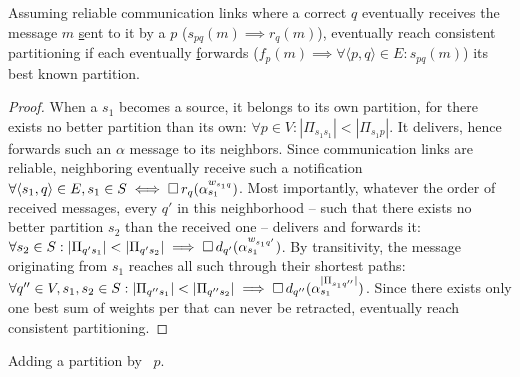 \begin{theorem} Assuming reliable
  communication links where a correct \process $q$ eventually receives
  the message $m$ \underline{s}ent to it by a \process $p$ ($s_{pq}(m)
  \implies r_{q}(m)$), \processes eventually reach consistent
  partitioning if each \process eventually \underline{f}orwards
  ($f_p(m) \implies \forall \langle p, q\rangle \in E: s_{pq}(m)$) its
  best known partition.
\end{theorem}

 

\begin{proof}
  When a \process $s_1$ becomes a source, it belongs to its own
  partition, for there exists no better partition than its own:
  $\forall p \in V: |\Pi_{s_1 s_1}| < |\Pi_{s_1 p}|$. It delivers,
  hence forwards such an $\alpha$ message to its neighbors. Since
  communication links are reliable, neighboring \processes eventually
  receive such a notification $\forall \langle s_1, q \rangle \in E,
  s_1 \in S \iff \square\, r_q(\alpha_{s_1}^{w_{s_1 q}})$. Most
  importantly, whatever the order of received messages, every \process
  $q'$ in this neighborhood -- such that there exists no better
  partition $s_2$ than the received one -- delivers and forwards it:
  $\forall s_2 \in S: |\Pi_{q' s_1}| < |\Pi_{q' s_2}| \implies
  \square\, d_{q'}(\alpha_{s_1}^{w_{s_1 q'}})$. By transitivity, the
  message originating from $s_1$ reaches all such \processes through
  their shortest paths: $\forall q'' \in V, s_1, s_2 \in S: |\Pi_{q''
    s_1}| < |\Pi_{q'' s_2}| \implies \square\,
  d_{q''}(\alpha_{s_1}^{|\Pi_{s_1 q''}|})$.  Since there exists only
  one best sum of weights per \process that can never be retracted,
  \processes eventually reach consistent partitioning.
\end{proof}

\begin{algorithm}
  
  \caption{\label{algo:add}Adding a partition by \Process~$p$.}
\end{algorithm}

